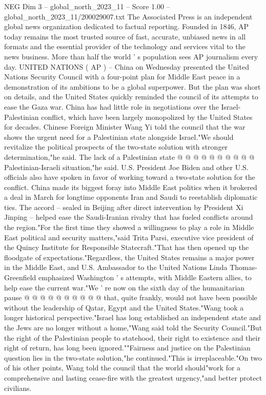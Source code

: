\begin{textsample}{NEG Dim 3 – global\_north\_2023\_11 – Score 1.00 – global\_north\_2023\_11/200029007.txt}  \label{ex:f3_neg_280}
The Associated Press is an independent global news organization dedicated to factual reporting.
Founded in 1846, AP today remains the most trusted source of fast, accurate, unbiased news in all formats and the essential provider of the technology and services vital to the news business.
More than half the world ' s population sees AP journalism every day.
UNITED NATIONS ( AP ) -- China on Wednesday presented the United Nations Security Council with a four-point plan for Middle East peace in a demonstration of its ambitions to be a global superpower.
But the plan was short on details, and the United States quickly reminded the council of its attempts to ease the Gaza war.
China has had little role in negotiations over the Israel-Palestinian conflict, which have been largely monopolized by the United States for decades.
Chinese Foreign Minister Wang Yi told the council that the war shows the urgent need for a Palestinian state alongside Israel."We should revitalize the political prospects of the two-state solution with stronger determination,"he said.
The lack of a Palestinian state @ @ @ @ @ @ @ @ @ @ Palestinian-Israeli situation,"he said.
U.S.
President Joe Biden and other U.S. officials also have spoken in favor of working toward a two-state solution for the conflict.
China made its biggest foray into Middle East politics when it brokered a deal in March for longtime opponents Iran and Saudi to reestablish diplomatic ties.
The accord -- sealed in Beijing after direct intervention by President Xi Jinping -- helped ease the Saudi-Iranian rivalry that has fueled conflicts around the region."For the first time they showed a willingness to play a role in Middle East political and security matters,"said Trita Parsi, executive vice president of the Quincy Institute for Responsible Statecraft."That has then opened up the floodgate of expectations."Regardless, the United States remains a major power in the Middle East, and U.S.
Ambassador to the United Nations Linda Thomas-Greenfield emphasized Washington ' s attempts, with Middle Eastern allies, to help ease the current war."We ' re now on the sixth day of the humanitarian pause @ @ @ @ @ @ @ @ @ @ that, quite frankly, would not have been possible without the leadership of Qatar, Egypt and the United States."Wang took a longer historical perspective."Israel has long established an independent state and the Jews are no longer without a home,"Wang said told the Security Council."But the right of the Palestinian people to statehood, their right to existence and their right of return, has long been ignored.""Fairness and justice on the Palestinian question lies in the two-state solution,"he continued."This is irreplaceable."On two of his other points, Wang told the council that the world should"work for a comprehensive and lasting cease-fire with the greatest urgency,"and better protect civilians.

\end{textsample}
